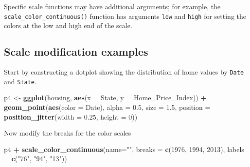 \documentclass[
]{book}
\newenvironment{Shaded}{\begin{snugshade}}{\end{snugshade}}
\newcommand{\DataTypeTok}[1]{\textcolor[rgb]{0.13,0.29,0.53}{#1}}
\newcommand{\DecValTok}[1]{\textcolor[rgb]{0.00,0.00,0.81}{#1}}
\newcommand{\FloatTok}[1]{\textcolor[rgb]{0.00,0.00,0.81}{#1}}
\newcommand{\KeywordTok}[1]{\textcolor[rgb]{0.13,0.29,0.53}{\textbf{#1}}}
\newcommand{\NormalTok}[1]{#1}
\newcommand{\OperatorTok}[1]{\textcolor[rgb]{0.81,0.36,0.00}{\textbf{#1}}}
\newcommand{\StringTok}[1]{\textcolor[rgb]{0.31,0.60,0.02}{#1}}
\begin{document}
Specific scale functions may have additional arguments; for example, the \texttt{scale\_color\_continuous()} function has arguments \texttt{low} and \texttt{high} for setting the colors at the low and high end of the scale.

\hypertarget{scale-modification-examples}{%
\subsection{Scale modification examples}\label{scale-modification-examples}}

Start by constructing a dotplot showing the distribution of home values by \texttt{Date} and \texttt{State}.

\begin{Shaded}
\begin{Highlighting}[]
\NormalTok{p4 \textless{}{-}}\StringTok{ }\KeywordTok{ggplot}\NormalTok{(housing, }\KeywordTok{aes}\NormalTok{(}\DataTypeTok{x =}\NormalTok{ State, }\DataTypeTok{y =}\NormalTok{ Home\_Price\_Index)) }\OperatorTok{+}\StringTok{ }
\StringTok{    }\KeywordTok{geom\_point}\NormalTok{(}\KeywordTok{aes}\NormalTok{(}\DataTypeTok{color =}\NormalTok{ Date), }\DataTypeTok{alpha =} \FloatTok{0.5}\NormalTok{, }\DataTypeTok{size =} \FloatTok{1.5}\NormalTok{,}
               \DataTypeTok{position =} \KeywordTok{position\_jitter}\NormalTok{(}\DataTypeTok{width =} \FloatTok{0.25}\NormalTok{, }\DataTypeTok{height =} \DecValTok{0}\NormalTok{))}
\end{Highlighting}
\end{Shaded}

Now modify the breaks for the color scales

\begin{Shaded}
\begin{Highlighting}[]
\NormalTok{p4 }\OperatorTok{+}\StringTok{ }
\StringTok{  }\KeywordTok{scale\_color\_continuous}\NormalTok{(}\DataTypeTok{name=}\StringTok{""}\NormalTok{,}
                         \DataTypeTok{breaks =} \KeywordTok{c}\NormalTok{(}\DecValTok{1976}\NormalTok{, }\DecValTok{1994}\NormalTok{, }\DecValTok{2013}\NormalTok{),}
                         \DataTypeTok{labels =} \KeywordTok{c}\NormalTok{(}\StringTok{"\textquotesingle{}76"}\NormalTok{, }\StringTok{"\textquotesingle{}94"}\NormalTok{, }\StringTok{"\textquotesingle{}13"}\NormalTok{))}
\end{Highlighting}
\end{Shaded}
\end{document}
